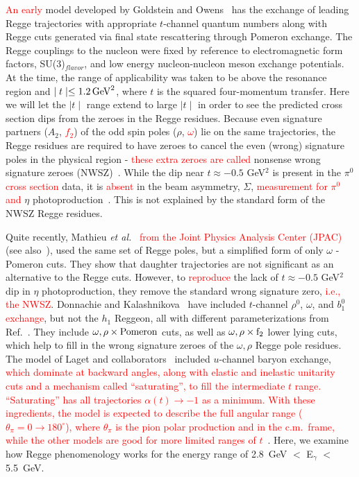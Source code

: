\documentclass[aps,prc,twocolumn,floatfix,showpacs,preprintnumbers,amsmath,amssymb,superscriptaddress,linenumbers]{revtex4-1}
\begin{document}
\textcolor{red}{An early} model developed by Goldstein and 
Owens~\cite{Goldstein:1973xn} has the exchange of leading Regge 
trajectories with appropriate $t$-channel quantum numbers along with 
Regge cuts generated via final state rescattering through Pomeron 
exchange. The Regge couplings to the nucleon were fixed by reference 
to electromagnetic form factors, SU(3)$_{flavor}$, and low energy 
nucleon-nucleon meson exchange potentials. At the time, the range of 
applicability was taken to be above the resonance region and $\mid 
t \mid \le 1.2 \, {\rm GeV}^2$, where $t$ is the squared 
four-momentum transfer. Here we will let the $\mid t \mid$ 
range extend to large $\mid t \mid$ in order to see the predicted cross 
section dips from the zeroes in the Regge residues. Because even signature partners ($A_2$, \textcolor{red}{$f_2$}) of the odd spin poles ($\rho$, \textcolor{red}{$\omega$}) lie on the same trajectories, the Regge residues are required to have zeroes to cancel the even (wrong) signature poles in the physical region - \textcolor{red}{these extra zeroes are called} nonsense wrong signature zeroes (NWSZ)~\cite{CHIU1971477}. While the dip near 
$t\approx -0.5$ GeV$^2$ is present in the $\pi^0$ \textcolor{red}{cross section} data, it is \textcolor{red}{absent} in the 
beam asymmetry, $\Sigma$, \textcolor{red}{measurement for $\pi^{0}$ and} $\eta$ 
photoproduction~\cite{AlGhoul:2017nbp}. This is not explained by the 
standard form of the NWSZ Regge residues. 
  
Quite recently, Mathieu {\it et al.}~\cite{Mathieu:2015eia} \textcolor{red}{from the Joint Physics Analysis Center (JPAC)}
(see also~\cite{Kashevarov:2017vyl}), used the same set of Regge poles, 
but a simplified form of only $\omega$ -Pomeron cuts. They show that 
daughter trajectories are not significant as an alternative to the 
Regge cuts. However, to \textcolor{red}{reproduce} the lack of $t\approx -0.5$ GeV$^2$ 
dip in $\eta$ photoproduction, they remove the standard wrong signature 
zero, \textcolor{red}{i.e., the NWSZ}.  Donnachie and Kalashnikova~\cite{Donnachie:2015jaa} 
have included $t$-channel $\rho^0$, $\omega$, and $b^0_1$ \textcolor{red}{exchange}, but not 
the $h_1$ Reggeon, all with different parameterizations from 
Ref.~\cite{Goldstein:1973xn}. They include $\omega, \rho \times {\rm 
Pomeron}$ cuts, as well as $\omega, \rho \times {\rm f}_2$ lower lying 
cuts, which help to fill in the wrong signature zeroes of the $\omega, 
\rho$ Regge pole residues. The model of Laget and collaborators~\cite{Laget:2005be} included 
$u$-channel baryon exchange, \textcolor{red}{which dominate at backward angles, along with 
	elastic and inelastic unitarity cuts and a mechanism called ``saturating'', to fill the intermediate 
	$t$ range. ``Saturating''  has all trajectories $\alpha(t) \rightarrow -1$ as a minimum. With 
	these ingredients, the model is expected to describe the full angular range ($\theta_{\pi}= 0 \to 180^{\circ}$), \textcolor{red}{where $\theta_{\pi}$ is the pion polar production and in the c.m.~frame},
	while the other models are good for more limited ranges of $t$}~\cite{Goldstein:1973xn,Mathieu:2015eia, Donnachie:2015jaa}. 
Here, we examine how Regge phenomenology works for the energy range of 2.8~GeV $< $ E$_\gamma$ $<$ 5.5~GeV.
\end{document}
